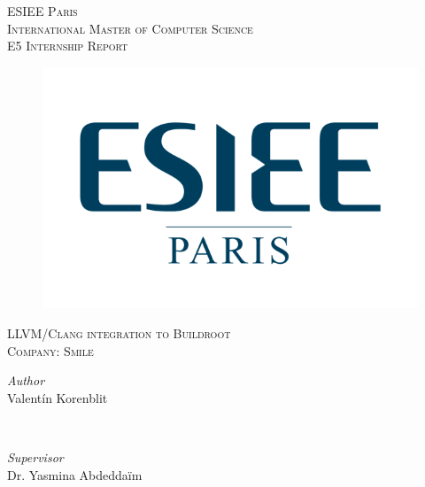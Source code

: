\documentclass[12pt,a4paper,oneside]{article}
\begin{document}

\begin{titlepage} %
	\newcommand{\HRule}{\rule{\linewidth}{0.5mm}} %

	\center %

	\textsc{\LARGE ESIEE Paris}\\[1.5cm] %

	\textsc{\Large International Master of Computer Science}\\[0.5cm] %

	\textsc{\Large E5 Internship Report}\\[0.5cm] %

	\begin{figure}[H]
	\centering
	  \includegraphics[scale=2]{img/logo_esiee.png}
	  \label{fig:logo_esiee}
	\end{figure}

	\textsc{\large LLVM/Clang integration to Buildroot}\\[1cm]

	\textsc{\large Company: Smile}\\[1cm]

	\begin{minipage}{0.4\textwidth}
		\begin{flushleft}
			\large
			\textit{Author}\\
			Valent\'{i}n Korenblit %
		\end{flushleft}
	\end{minipage}
	~
	\begin{minipage}{0.4\textwidth}
		\begin{flushright}
			\large
			\textit{Supervisor}\\
			Dr. Yasmina Abdedda\"{i}m %
		\end{flushright}
	\end{minipage}


\end{titlepage}
\end{document}
